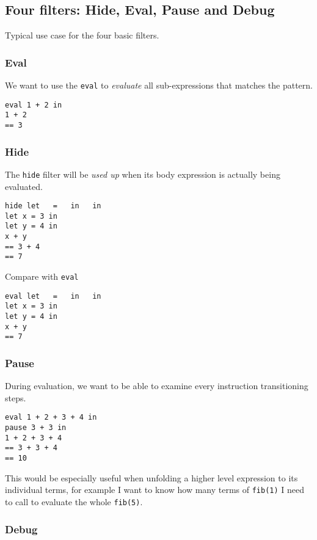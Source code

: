 \subsection{Four filters: Hide, Eval, Pause and Debug}


Typical use case for the four basic filters.

\subsubsection{Eval}

We want to use the \verb|eval| to \emph{evaluate} all sub-expressions that matches the pattern.
\begin{verbatim}
eval 1 + 2 in
1 + 2
== 3
\end{verbatim}

\subsubsection{Hide}

The \verb|hide| filter will be \emph{used up} when its body
expression is actually being evaluated.

\begin{verbatim}
hide let   =   in   in
let x = 3 in
let y = 4 in
x + y
== 3 + 4
== 7
\end{verbatim}
Compare with \verb|eval|
\begin{verbatim}
eval let   =   in   in
let x = 3 in
let y = 4 in
x + y
== 7
\end{verbatim}

\subsubsection{Pause}

During evaluation, we want to be able to examine every instruction
transitioning steps.

\begin{verbatim}
eval 1 + 2 + 3 + 4 in
pause 3 + 3 in
1 + 2 + 3 + 4
== 3 + 3 + 4
== 10
\end{verbatim}

This would be especially useful when unfolding a higher level
expression to its individual terms, for example I want to know how
many terms of \verb|fib(1)| I need to call to evaluate the whole
\verb|fib(5)|.

\subsubsection{Debug}

